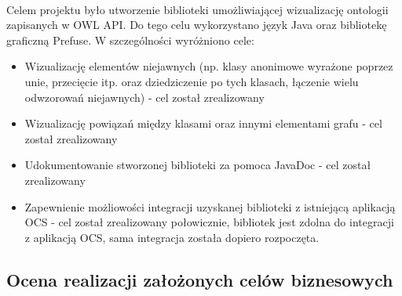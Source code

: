 \documentclass[a4paper,10pt]{article}
\begin{document}
\paragraph{} Celem projektu było utworzenie biblioteki umożliwiającej wizualizację ontologii zapisanych w OWL API. Do tego celu wykorzystano język Java oraz bibliotekę graficzną Prefuse.  W szczególności wyróżniono cele:
\begin{itemize}
 \item Wizualizację elementów niejawnych (np. klasy anonimowe wyrażone
poprzez unie, przecięcie itp. oraz dziedziczenie po tych klasach,
łączenie wielu odwzorowań niejawnych)  -  cel został zrealizowany 
\item  Wizualizację powiązań między klasami oraz innymi elementami grafu - cel został zrealizowany 
\item  Udokumentowanie stworzonej biblioteki za pomoca JavaDoc - cel został zrealizowany
\item  Zapewnienie możliowości integracji uzyskanej biblioteki z istniejącą aplikacją OCS - cel został zrealizowany połowicznie, bibliotek jest zdolna do integracji z aplikacją OCS, sama integracja została dopiero rozpoczęta.
\end{itemize}


\subsection{ Ocena realizacji założonych celów biznesowych}
\end{document}
